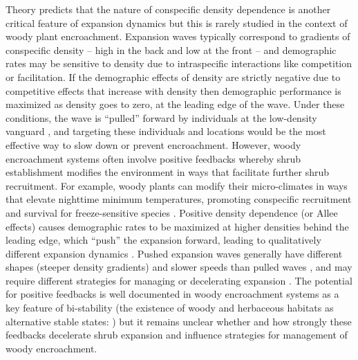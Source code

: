 \documentclass[11pt]{article}\usepackage[]{graphicx}\usepackage[usenames,dvipsnames]{xcolor}
\begin{document}
Theory predicts that the nature of conspecific density dependence is another critical feature of expansion dynamics but this is rarely studied in the context of woody plant encroachment.  
Expansion waves typically correspond to gradients of conspecific density -- high in the back and low at the front -- and demographic rates may be sensitive to density due to intraspecific interactions like competition or facilitation.
If the demographic effects of density are strictly negative due to competitive effects that increase with density then demographic performance is maximized as density goes to zero, at the leading edge of the wave. 
Under these conditions, the wave is ``pulled'' forward by individuals at the low-density vanguard \citep{kot1996dispersal}, and targeting these individuals and locations would be the most effective way to slow down or prevent encroachment. 
However, woody encroachment systems often involve positive feedbacks whereby shrub establishment modifies the environment in ways that facilitate further shrub recruitment. 
For example, woody plants can modify their micro-climates in ways that elevate nighttime minimum temperatures, promoting conspecific recruitment and survival for freeze-sensitive species \citep{d2010positive,huang2020critical}. 
Positive density dependence (or Allee effects) causes demographic rates to be maximized at higher densities behind the leading edge, which ``push'' the expansion forward, leading to qualitatively different expansion dynamics \citep{kot1996dispersal, taylor2005allee, sullivan2017density, lewis1993allee, veit1996dispersal, keitt2001allee}.
Pushed expansion waves generally have different shapes (steeper density gradients) and slower speeds than pulled waves \citep{gandhi2016range}, and may require different strategies for managing or decelerating expansion \citep{taylor2005allee}. 
The potential for positive feedbacks is well documented in woody encroachment systems as a key feature of bi-stability (the existence of woody and herbaceous habitats as alternative stable states: \cite{wilcox2018emerging}) but it remains unclear whether and how strongly these feedbacks decelerate shrub expansion and influence strategies for management of woody encroachment.
\end{document}
